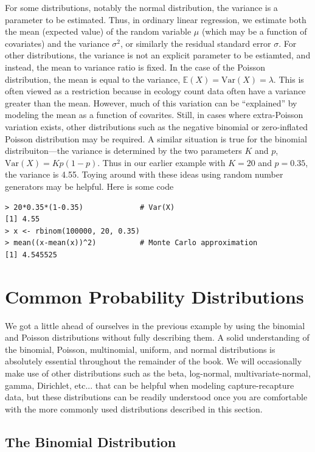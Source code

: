 For some distributions, notably the normal distribution, the variance
is a parameter to be estimated. Thus, in ordinary linear regression,
we estimate both the mean (expected value) of the random variable
$\mu$ (which may be a function of covariates) and the variance
$\sigma^2$, or similarly the residual standard error $\sigma$. For
other distributions, the variance is not an explicit parameter to be
estiamted, and instead, the mean to variance ratio is fixed. In the
case of the Poisson distribution, the mean is equal to the
variance, $\mathbb{E}(X) = \text{Var}(X) = \lambda$. This is often viewed as a restriction because in ecology
count data often have a variance greater than the mean. However, much
of this variation can be ``explained'' by modeling the mean as a
function of covarites. Still, in cases where extra-Poisson variation
exists, other distributions such as the negative binomial or
zero-inflated Poisson distribution may be required. A similar
situation is true for the binomial distribuiton---the variance is
determined by the two parameters $K$ and $p$, $\text{Var}(X) = Kp(1-p)$. Thus
in our earlier example with $K=20$ and $p=0.35$, the variance is
4.55. Toying around with these ideas using random number generators
may be helpful. Here is some code
\begin{verbatim}
> 20*0.35*(1-0.35)             # Var(X)
[1] 4.55
> x <- rbinom(100000, 20, 0.35)
> mean((x-mean(x))^2)          # Monte Carlo approximation
[1] 4.545525
\end{verbatim}



\section{Common Probability Distributions}
\label{sec.modeling.distributions}

We got a little ahead of ourselves in the previous example by using
the binomial and Poisson distributions without fully describing them.
A solid understanding of the binomial, Poisson, multinomial, uniform,
and normal distributions is absolutely essential throughout the
remainder of the book. We will occasionally make use of other
distributions such as the beta, log-normal, multivariate-normal,
gamma, Dirichlet, etc... that can be helpful when
modeling capture-recapture data, but these distributions can be
readily understood once you are comfortable with the more commonly
used distributions described in this section.

\subsection{The Binomial Distribution}

